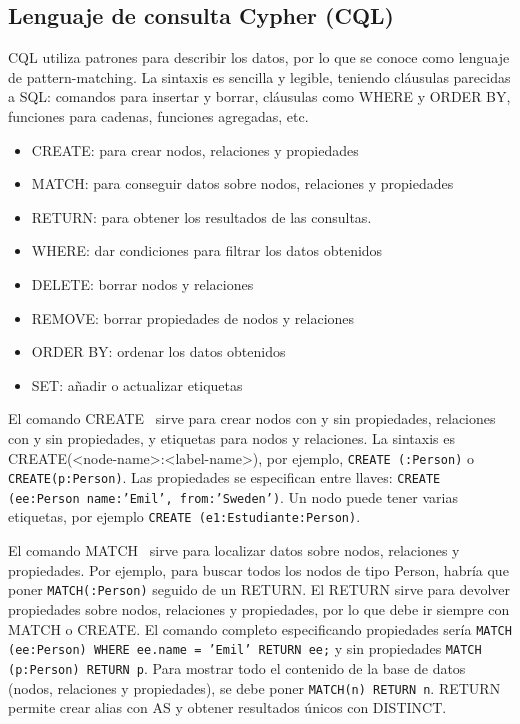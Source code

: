 \subsection{Lenguaje de consulta Cypher (CQL)}
CQL utiliza patrones para describir los datos, por lo que se conoce como lenguaje de pattern-matching. La sintaxis es sencilla y legible, teniendo cláusulas parecidas a SQL: comandos para insertar y borrar, cláusulas como WHERE y ORDER BY, funciones para cadenas, funciones agregadas, etc.
\begin{itemize}
\item CREATE: para crear nodos, relaciones y propiedades
\item MATCH: para conseguir datos sobre nodos, relaciones y propiedades
\item RETURN: para obtener los resultados de las consultas.
\item WHERE: dar condiciones para filtrar los datos obtenidos
\item DELETE: borrar nodos y relaciones
\item REMOVE: borrar propiedades de nodos y relaciones
\item ORDER BY: ordenar los datos obtenidos
\item SET: añadir o actualizar etiquetas
\end{itemize}

El comando CREATE   \ sirve para crear nodos con y sin propiedades, relaciones con y sin propiedades, y etiquetas para nodos y relaciones. La sintaxis es CREATE(<node-name>:<label-name>), por ejemplo, \texttt{CREATE (:Person)} o \texttt{CREATE(p:Person)}. Las propiedades se especifican entre llaves: \texttt{CREATE (ee:Person {name:'Emil', from:'Sweden'})}. Un nodo puede tener varias etiquetas, por ejemplo \texttt{CREATE (e1:Estudiante:Person)}.

El comando MATCH   \ sirve para localizar datos sobre nodos, relaciones y propiedades. Por ejemplo, para buscar todos los nodos de tipo Person, habría que poner \texttt{MATCH(:Person)} seguido de un RETURN. El RETURN sirve para devolver propiedades sobre nodos, relaciones y propiedades, por lo que debe ir siempre con MATCH o CREATE. El comando completo especificando propiedades sería \texttt{MATCH (ee:Person) WHERE ee.name = 'Emil' RETURN ee;} y sin propiedades \texttt{MATCH (p:Person) RETURN p}. Para mostrar todo el contenido de la base de datos (nodos, relaciones y propiedades), se debe poner \texttt{MATCH(n) RETURN n}. RETURN permite crear alias con AS y obtener resultados únicos con DISTINCT. 

